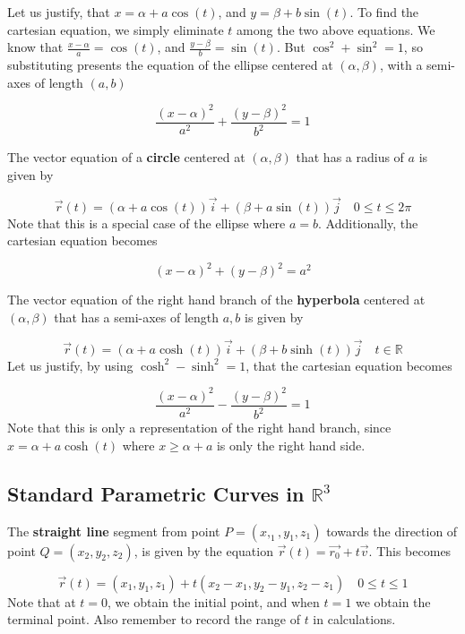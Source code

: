 \documentclass[11pt]{article}
\theoremstyle{plain} %
\theoremstyle{definition}
\theoremstyle{example}
\theoremstyle{remark}
\begin{document}
Let us justify, that $x = \alpha + a \cos(t)$, and $y = \beta + b \sin(t)$. To find the cartesian equation, we simply eliminate $t$ among the two above equations. We know that $\frac{x- \alpha}{a} = \cos(t)$, and $\frac{y- \beta}{b} = \sin(t)$.
But $\cos^2 + \sin^2 = 1$, so substituting presents the equation of the ellipse centered at $(\alpha, \beta)$, with a semi-axes of length $(a, b)$

$$\frac{(x - \alpha)^2}{a^2}+ \frac{(y-\beta)^2}{b^2} = 1$$

\bigskip
The vector equation of a \textbf{circle} centered at $(\alpha, \beta)$ that has a radius of $a$ is given by

$$\vec{r}(t) = (\alpha + a \cos(t))\vec{i} + (\beta + a \sin (t))\vec{j} \quad 0 \leq t \leq 2\pi$$
Note that this is a special case of the ellipse where $a=b$. Additionally, the cartesian equation becomes

$$(x-\alpha)^2 +(y-\beta)^2 = a^2$$

\bigskip
The vector equation of the right hand branch of the \textbf{hyperbola} centered at $(\alpha, \beta)$ that has a semi-axes of length $a, b$ is given by

$$\vec{r}(t) = (\alpha +a \cosh(t))\vec{i} + (\beta + b \sinh(t))\vec{j} \quad t \in \mathbb R$$
Let us justify, by using $\cosh^2 - \sinh^2 = 1$, that the cartesian equation becomes

$$\frac{(x- \alpha)^2}{a^2} - \frac{(y - \beta)^2}{b^2} = 1$$
Note that this is only a representation of the right hand branch, since $x = \alpha + a \cosh(t)$ where $x \geq \alpha + a$ is only the right hand side.

\bigskip



\subsection{Standard Parametric Curves in $\mathbb R^3$}

The \textbf{straight line} segment from point $P = (x,_1, y_1, z_1)$ towards the direction of point $Q = (x_2, y_2, z_2)$, is given by the equation $\vec{r}(t) = \vec{r_0} + t \vec{v}$. This becomes

	$$\vec{r}(t) = (x_1, y_1, z_1) + t(x_2-x_1, y_2-y_1, z_2-z_1) \quad 0 \leq t \leq 1$$	
Note that at $t = 0$, we obtain the initial point, and when $t=1$ we obtain the terminal point. Also remember to record the range of $t$ in calculations.
\end{document}
